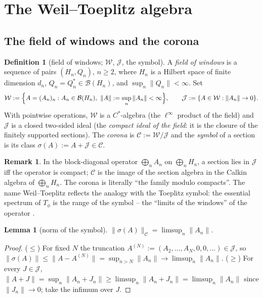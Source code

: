 \documentclass[11pt,reqno]{amsart}
\newtheorem{lemma}[theorem]{Lemma}
\theoremstyle{definition}
\newtheorem{definition}[theorem]{Definition}
\newtheorem{remark}[theorem]{Remark}
\newcommand{\W}{\mathcal{W}}
\newcommand{\Jc}{\mathcal{J}}
\newcommand{\Cor}{\mathcal{C}}
\begin{document}
\section{The Weil--Toeplitz algebra}\label{sec:algebra}

\subsection{The field of windows and the corona}

\begin{definition}[field of windows; \(\W\), \(\Jc\), the symbol]\label{def:field}
A \emph{field of windows} is a sequence of pairs
\((H_n,Q_n)\), \(n\geq2\), where \(H_n\) is a Hilbert space of finite dimension \(d_n\), \(Q_n=Q_n^*\in\mathcal B(H_n)\), and
\(\sup_n\|Q_n\|<\infty\). Set
\[
\W:=\Bigl\{A=(A_n)_n:A_n\in\mathcal B(H_n),\ \|A\|:=\sup_n\|A_n\|<\infty\Bigr\},
\qquad
\Jc:=\{A\in\W:\|A_n\|\to0\}.
\]
With pointwise operations, \(\W\) is a \(C^*\)-algebra (the \(\ell^\infty\)
product of the field) and \(\Jc\) is a closed two-sided ideal (the
\emph{compact ideal of the field}: it is the closure of the finitely supported
sections). The \emph{corona} is \(\Cor:=\W/\Jc\) and the \emph{symbol} of a
section is its class \(\sigma(A):=A+\Jc\in\Cor\).
\end{definition}

\begin{remark}
In the block-diagonal operator \(\bigoplus_n A_n\) on \(\bigoplus_n H_n\), a
section lies in \(\Jc\) iff the operator is compact; \(\Cor\) is the image of
the section algebra in the Calkin algebra of \(\bigoplus_n H_n\). The corona is
literally ``the family modulo compacts''. The name Weil--Toeplitz reflects the
analogy with the Toeplitz symbol: the essential spectrum of \(T_\phi\) is the
range of the symbol -- the ``limits of the windows'' of the operator
\cite{BottcherSilbermann,RabinovichRochSilbermann}.
\end{remark}

\begin{lemma}[norm of the symbol]\label{lem:symbol-norm}
\(\|\sigma(A)\|_{\Cor}=\limsup_n\|A_n\|\).
\end{lemma}

\begin{proof}
(\(\leq\)) For fixed \(N\) the truncation
\(A^{(N)}:=(A_2,\dots,A_N,0,0,\dots)\in\Jc\), so
\(\|\sigma(A)\|\leq\|A-A^{(N)}\|=\sup_{n>N}\|A_n\|\to\limsup_n\|A_n\|\). (\(\geq\))
For every \(J\in\Jc\),
\(\|A+J\|=\sup_n\|A_n+J_n\|\geq\limsup_n\|A_n+J_n\|=\limsup_n\|A_n\|\) since
\(\|J_n\|\to0\); take the infimum over \(J\).
\end{proof}
\end{document}

